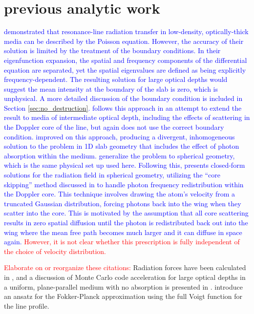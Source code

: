 \documentclass{aastex63}
\newcommand{\todo}[1]{\textcolor{red}{#1}}
\newcommand{\proposed}[1]{\textcolor{blue}{#1}}
\begin{document}
\section{ previous analytic work }

\proposed{\citet{1973MNRAS.162...43H, 1974MNRAS.166..373H} demonstrated that resonance-line radiation transfer in low-density, optically-thick media can be described by the Poisson equation. However, the accuracy of their solution is limited by the treatment of the boundary conditions. In their eigenfunction expansion, the spatial and frequency components of the differential equation are separated, yet the spatial eigenvalues are defined as being explicitly frequency-dependent. The resulting solution for large optical depths would suggest the mean intensity at the boundary of the slab is zero, which is unphysical. A more detailed discussion of the boundary condition is included in Section \ref{sec:no_destruction}. \citet{1990ApJ...350..216N} follows this approach in an attempt to extend the result to media of intermediate optical depth, including the effects of scattering in the Doppler core of the line, but again does not use the correct boundary condition. \citet{1990ApJ...350..216N} improved on this approach, producing a divergent, inhomogeneous solution to the problem in 1D slab geometry that includes the effect of photon absorption within the medium. \citet{2006ApJ...649...14D} generalize the problem to spherical geometry, which is the same physical set up used here. Following this, \citet{2020arXiv200509692L} presents closed-form solutions for the radiation field in spherical geometry, utilizing the ``core skipping'' method discussed in \citet{2015MNRAS.449.4336S} to handle photon frequency redistribution within the Doppler core. This technique involves drawing the atom's velocity from a truncated Gaussian distribution, forcing photons back into the wing when they scatter into the core. This is motivated by the assumption that all core scattering results in zero spatial diffusion until the photon is redistributed back out into the wing where the mean free path becomes much larger and it can diffuse in space again.} \todo{However, it is not clear whether this prescription is fully independent of the choice of velocity distribution.} 

\todo{Elaborate on or reorganize these citations:}
Radiation forces have been calculated in \citet{1976ApJ...208..286W}, and a discussion of Monte Carlo code acceleration for large optical depths in a uniform, plane-parallel medium with no absorption is presented in  \citet{2002ApJ...567..922A,2015MNRAS.449.4336S}. \citet{1994ApJ...427..603R} introduce an ansatz for the Fokker-Planck approximation using the full Voigt function for the line profile.
\end{document}

